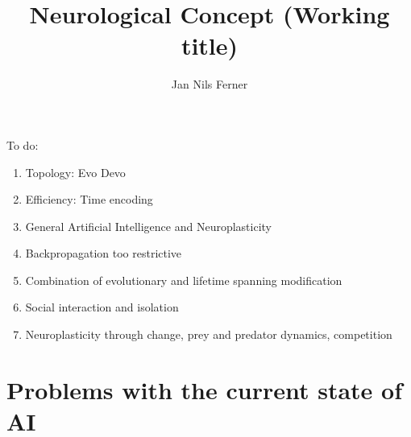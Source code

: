 \documentclass[a4paper]{article}
\title{Neurological Concept (Working title)}
\author{Jan Nils Ferner}
\begin{document}
\maketitle
\thispagestyle{empty}

\clearpage

\twocolumn

\begin{abstract}
	
\end{abstract}

\clearpage

\onecolumn
\tableofcontents
\twocolumn

\clearpage

To do:
\begin{enumerate}
	\item Topology: Evo Devo
	\item Efficiency: Time encoding
	\item General Artificial Intelligence and Neuroplasticity
	\item Backpropagation too restrictive
	\item Combination of evolutionary and lifetime spanning modification
	\item Social interaction and isolation
	\item Neuroplasticity through change, prey and predator dynamics, competition
\end{enumerate}

\section{Problems with the current state of AI}
	

\clearpage

\nocite{*}


\end{document}
